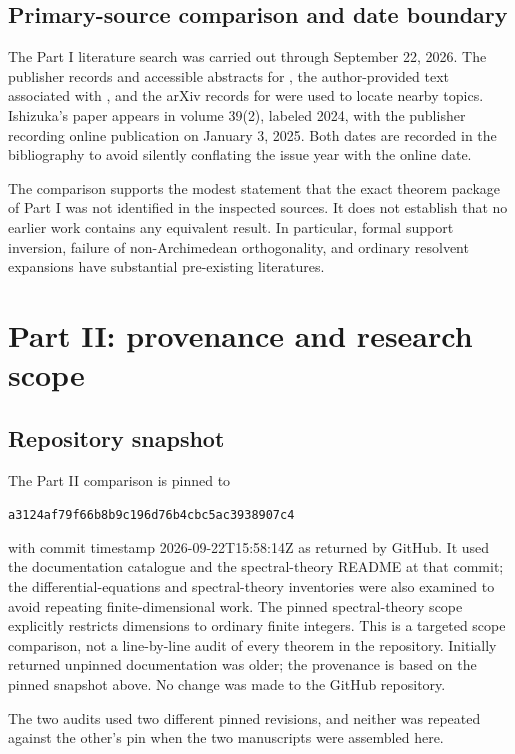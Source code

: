 \documentclass[11pt,a4paper]{article}
\numberwithin{equation}{section}
\theoremstyle{definition}
\theoremstyle{remark}
\newcommand{\commitB}{a3124af79f66b8b9c196d76b4cbc5ac3938907c4}
\begin{document}
\subsection{Primary-source comparison and date boundary}\label{ihs:app:datesA}
The Part I literature search was carried out through September 22, 2026. The
publisher records and accessible abstracts for \cite{ANS,Ishizuka}, the
author-provided text associated with \cite{AN}, and the arXiv records for
\cite{Boasso,Miabey} were used to locate nearby topics. Ishizuka's paper
appears in volume 39(2), labeled 2024, with the publisher recording online
publication on January 3, 2025. Both dates are recorded in the bibliography
to avoid silently conflating the issue year with the online date.

The comparison supports the modest statement that the exact theorem package
of Part I was not identified in the inspected sources. It does not establish
that no earlier work contains any equivalent result. In particular, formal
support inversion, failure of non-Archimedean orthogonality, and ordinary
resolvent expansions have substantial pre-existing literatures.

\section{Part II: provenance and research scope}\label{ihs:app:auditB}

\subsection{Repository snapshot}\label{ihs:app:snapshotB}
The Part II comparison is pinned to
\begin{center}\small\texttt{\commitB}\end{center}
with commit timestamp 2026-09-22T15:58:14Z as returned by GitHub. It used
the documentation catalogue and the spectral-theory README at that commit;
the differential-equations and spectral-theory inventories were also
examined to avoid repeating finite-dimensional work. The pinned
spectral-theory scope explicitly restricts dimensions to ordinary finite
integers. This is a targeted scope comparison, not a line-by-line audit of
every theorem in the repository. Initially returned unpinned documentation
was older; the provenance is based on the pinned snapshot above. No change
was made to the GitHub repository.

The two audits used two different pinned revisions, and neither was repeated
against the other's pin when the two manuscripts were assembled here.
\end{document}
